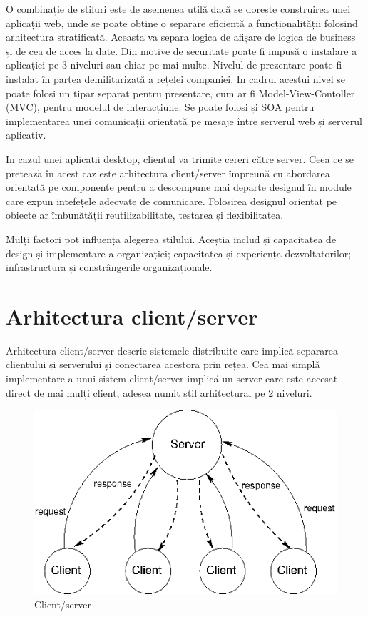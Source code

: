 \documentclass[12pt, a4paper, oneside, romanian]{teza-upb}
\begin{document}
O combinație de stiluri este de asemenea utilă dacă se dorește construirea unei aplicații web, unde se poate obține o separare eficientă a funcționalității folosind arhitectura stratificată. Aceasta va separa logica de afișare de logica de business și de cea de acces la date. Din motive de securitate poate fi impusă o instalare a aplicației pe 3 niveluri sau chiar pe mai multe.
Nivelul de prezentare poate fi instalat în partea demilitarizată a rețelei companiei. In cadrul acestui nivel se poate folosi un tipar separat pentru presentare, cum ar fi Model-View-Contoller (MVC), pentru modelul de interacțiune.  
Se poate folosi și SOA pentru implementarea unei comunicații orientată pe mesaje între serverul web și serverul aplicativ.

In cazul unei aplicații desktop, clientul va trimite cereri către server. Ceea ce se pretează în acest caz este arhitectura client/server împreună cu abordarea orientată pe componente pentru a descompune mai departe designul în module care expun intefețele adecvate de comunicare. Folosirea designul orientat pe obiecte ar îmbunătății reutilizabilitate, testarea și flexibilitatea.

Mulți factori pot influența alegerea stilului. Aceștia includ și capacitatea de design și implementare a organizației; capacitatea și experiența dezvoltatorilor; infrastructura și constrângerile organizaționale. 

\section{Arhitectura client/server}
Arhitectura client/server descrie sistemele distribuite care implică separarea clientului și serverului și conectarea acestora prin rețea. Cea mai simplă implementare a unui sistem client/server implică un server care este accesat direct de mai mulți client, adesea numit stil arhitectural pe 2 niveluri.

\begin{figure}[ht]
\centering
\includegraphics*[scale=0.8]{img/clientserver.png}
\caption{Client/server}
\label{fig:client_server}
\end{figure}
\end{document}
